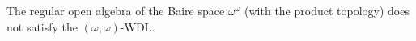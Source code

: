 The regular open algebra of the Baire space $\omega^{\omega}$ (with the product topology) does not satisfy the $(\omega, \omega)$-WDL.
